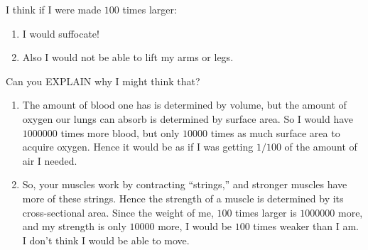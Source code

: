 \documentclass[handout,nooutcomes,noauthor]{ximera}
\begin{document}
\begin{question}
  I think if I were made $100$ times larger:
  \begin{enumerate}
  \item I would suffocate!
  \item Also I would not be able to lift my arms or legs.
  \end{enumerate}
  Can you EXPLAIN why I might think that?

  \begin{freeResponse}
    \begin{enumerate}
    \item The amount of blood one has is determined by volume, but the
      amount of oxygen our lungs can absorb is determined by surface
      area. So I would have $1000000$ times more blood, but only
      $10000$ times as much surface area to acquire oxygen. Hence it
      would be as if I was getting $1/100$ of the amount of air I
      needed.
    \item So, your muscles work by contracting ``strings,'' and
      stronger muscles have more of these strings. Hence the strength
      of a muscle is determined by its cross-sectional area. Since the
      weight of me, $100$ times larger is $1000000$ more, and my
      strength is only $10000$ more, I would be $100$ times weaker
      than I am. I don't think I would be able to move. 
    \end{enumerate}
  \end{freeResponse}
  
\end{question}
\end{document}
